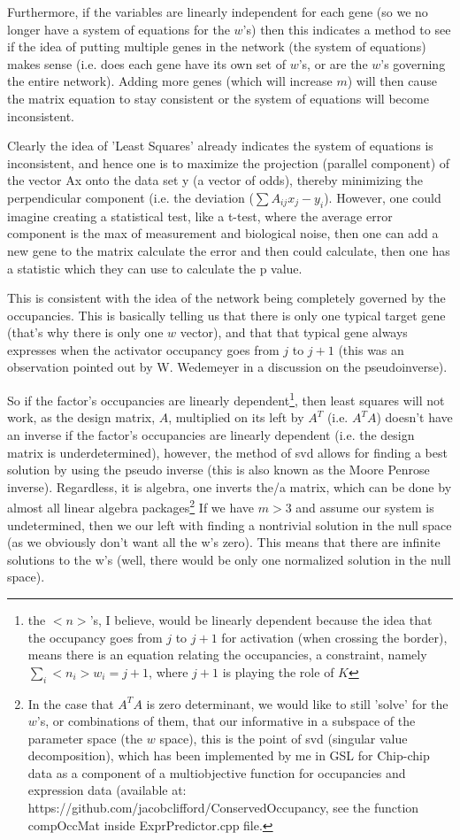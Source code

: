 Furthermore, if the variables are linearly independent for each gene (so we no longer have a system of equations for the $w$'s) then this indicates a method to see if the idea of putting multiple genes in the network (the system of equations) makes sense (i.e. does each gene have its own set of $w$'s, or are the $w$'s governing the entire network).  Adding more genes (which will increase $m$) will then cause the matrix equation to stay consistent or the system of equations will become inconsistent.  

Clearly the idea of 'Least Squares' already indicates the system of equations is inconsistent, and hence one is to maximize the projection (parallel component) of the vector Ax onto the data set y (a vector of odds), thereby minimizing the perpendicular component (i.e. the deviation ($\sum A_{ij} x_j - y_i$).  However, one could imagine creating a statistical test, like a t-test, where the average error component is the max of measurement and biological noise, then one can add a new gene to the matrix calculate the error and then could calculate, then one has a statistic which they can use to calculate the p value.

This is consistent with the idea of the network being completely governed by the occupancies.  This is basically telling us that there is only one typical target gene (that's why there is only one $w$ vector), and that that typical gene always expresses when the activator occupancy goes from $j$ to $j+1$ (this was an observation pointed out by W. Wedemeyer in a discussion on the pseudoinverse).

So if the factor's occupancies are linearly dependent\footnote[2]{ the $<n>$'s, I believe, would be linearly dependent because the idea that the occupancy goes from $j$ to $j+1$ for activation (when crossing the border), means there is an equation relating the occupancies, a constraint, namely $\sum_i<n_i>w_i = j+1$, where $j+1$ is playing the role of $K$}, then least squares will not work, as the design matrix, $A$, multiplied on its left by $A^T$ (i.e. $A^TA$) doesn't have an inverse if the factor's occupancies are linearly dependent (i.e. the design matrix is underdetermined), however, the method of svd allows for finding a best solution by using the pseudo inverse (this is also known as the Moore Penrose inverse).  Regardless, it is algebra, one inverts the/a matrix, which can be done by almost all linear algebra packages\footnote{In the case that $A^TA$ is zero determinant, we would like to still 'solve' for the $w$'s, or combinations of them, that our informative in a subspace of the parameter space (the $w$ space), this is the point of svd (singular value decomposition), which has been implemented by me in GSL for Chip-chip data as a component of a multiobjective function for occupancies and expression data (available at: https://github.com/jacobclifford/ConservedOccupancy, see the function compOccMat inside ExprPredictor.cpp file.} If we have $m >3$ and assume our system is undetermined, then we our left with finding a nontrivial solution in the null space (as we obviously don't want all the w's zero).  This means that there are infinite solutions to the w's (well, there would be only one normalized solution in the null space). 
